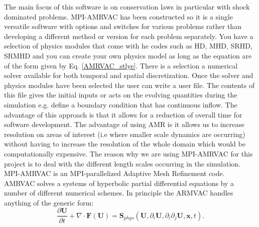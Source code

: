 \documentclass[12pt]{ociamthesis}
\begin{document}
The main focus of this software is on conservation laws in particular with shock dominated problems. MPI-AMRVAC has been constructed so it is a single versatile software with options and switches for various problems rather than developing a different method or version for each problem separately. You have a selection of physics modules that come with he codes such as HD, MHD, SRHD, SRMHD and you can create your own physics model as long as the equation are of the form given by Eq. \eqref{AMRVAC_stlye}. There is a selection a numerical solver available for both temporal and spatial discretization. Once the solver and physics modules have been selected the user can write a user file. The contents of this file gives the initial inputs or acts on the evolving quantities during the simulation e.g. define a boundary condition that has continuous inflow. The advantage of this approach is that it allows for a reduction of overall time for software development. The advantage of using AMR is it allows us to increase resolution on areas of interest (i.e where smaller scale dynamics are occurring) without having to increase the resolution of the whole domain which would be computationally expensive. The reason why we are using MPI-AMRVAC for this project is to deal with the different length scales occurring in the simulation.
MPI-AMRVAC is an MPI-parallelized Adaptive Mesh Refinement code. AMRVAC solves a systems of hyperbolic partial differential equations by a number of different numerical schemes. In principle the ARMVAC handles anything of the generic form: 
\begin{equation}
\frac{\partial \boldsymbol{U}}{\partial t} + \nabla \cdot \boldsymbol{F}(\boldsymbol{U}) = \boldsymbol{S}_{phys} (\boldsymbol{U}, \partial_{i} \boldsymbol{U}, \partial_i \partial_j \boldsymbol{U},\boldsymbol{x},t) .
\end{equation}
\end{document}
